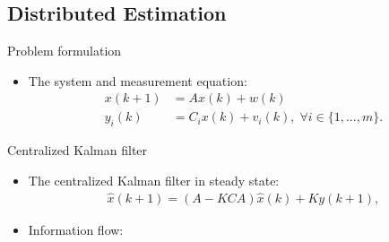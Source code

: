 \documentclass[10pt]{beamer}
\DeclareMathOperator{\1}{\textbf{1}}
\begin{document}
	  \subsection{Distributed Estimation}
	  \begin{frame}{Problem formulation}
	    \begin{itemize}
	      \item The system and measurement equation:
		\begin{align*}
		  x(k+1)&=Ax(k)+w(k)\\
		  y_i(k)&=C_ix(k)+v_i(k), \;\forall i\in\{1,...,m\}.
		\end{align*}
	    \end{itemize}
	  \end{frame}

	  \begin{frame}{Centralized Kalman filter}
	    \begin{itemize}
	      \item The centralized Kalman filter in steady state:
		\begin{align*}
		  \hat x(k+1)=(A-KCA)\hat x(k)+Ky(k+1),
		\end{align*}
	      \item Information flow:
		\begin{figure}
		  \centering
		  \resizebox{0.5\textwidth}{!}{}
		\end{figure}
	    \end{itemize}
	  \end{frame}
\end{document}
